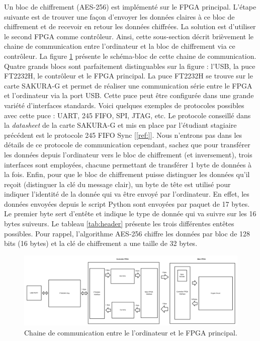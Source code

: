 \documentclass[oneside]{book}
\begin{document}
Un bloc de chiffrement (AES-256) est implémenté sur le FPGA principal. L'étape suivante est de trouver une façon d'envoyer les données claires à ce bloc de chiffrement et de recevoir en retour les données chiffrées. La solution est d'utiliser le second FPGA comme contrôleur. Ainsi, cette sous-section décrit brièvement le chaine de communication entre l'ordinateur et la bloc de chiffrement via ce contrôleur. La figure \ref{fig:FPGA_Controler} présente le schéma-bloc de cette chaine de communication. Quatre grands blocs sont parfaitement distinguables sur la figure : l'USB, la puce FT2232H, le contrôleur et le FPGA principal. La puce FT2232H se trouve sur le carte SAKURA-G et permet de réaliser une communication série entre le FPGA et l'ordinateur via la port USB. Cette puce peut être configurée dans une grande variété d'interfaces standards. Voici quelques exemples de protocoles possibles avec cette puce : UART, 245 FIFO, SPI, JTAG, etc. Le protocole conseillé dans la \textit{datasheet} de la carte SAKURA-G et mis en place par l'étudiant stagiaire précédent est le protocole 245 FIFO Sync [\ref{ref:}]. Nous n'entrons pas dans les détails de ce protocole de communication cependant, sachez que pour transférer les données depuis l'ordinateur vers le bloc de chiffrement (et inversement), trois interfaces sont employées, chacune permettant de transférer 1 byte de données à la fois. Enfin, pour que le bloc de chiffrement puisse distinguer les données qu'il reçoit (distinguer la clé du message clair), un byte de tête est utilisé pour indiquer l'identité de la donnée qui va être envoyé par l'ordinateur. En effet, les données envoyées depuis le script Python sont envoyées par paquet de 17 bytes. Le premier byte sert d'entête et indique le type de donnée qui va suivre sur les 16 bytes suiveurs. Le tableau \ref{tab:header} présente les trois différentes entêtes possibles. Pour rappel, l'algorithme AES-256 chiffre les données par bloc de 128 bits (16 bytes) et la clé de chiffrement a une taille de 32 bytes.

\begin{figure}[htbp]
    \hspace{-2cm}
    \includegraphics[scale=0.56]{image/FPGA_Controler}
    \caption{Chaine de communication entre le l'ordinateur et le FPGA principal.}
    \label{fig:FPGA_Controler} 
\end{figure}
\end{document}
